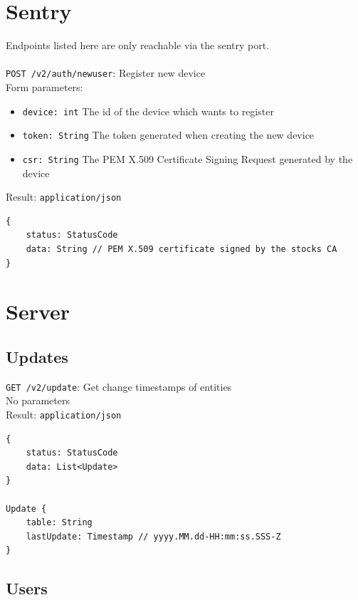 \documentclass[12pt]{report}
\begin{document}
\section{Sentry}

Endpoints listed here are only reachable via the sentry port. \\\\
\texttt{POST /v2/auth/newuser}: Register new device\\
Form parameters:
\begin{itemize}
\item \texttt{device: int} The id of the device which wants to register
\item \texttt{token: String} The token generated when creating the new device
\item \texttt{csr: String} The PEM X.509 Certificate Signing Request generated by the device
\end{itemize}
Result: \texttt{application/json}
\begin{lstlisting}
{
    status: StatusCode
    data: String // PEM X.509 certificate signed by the stocks CA
}
\end{lstlisting}

\section{Server}

\subsection{Updates}

\texttt{GET /v2/update}: Get change timestamps of entities\\
No parameters\\
Result: \texttt{application/json}
\begin{lstlisting}
{
    status: StatusCode
    data: List<Update>
}

Update {
    table: String
    lastUpdate: Timestamp // yyyy.MM.dd-HH:mm:ss.SSS-Z
}
\end{lstlisting}

\subsection{Users}
\end{document}
